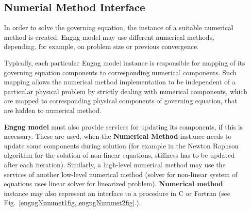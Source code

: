 \documentclass[a4paper]{article}
\newcommand{\class}[1]{{\bf #1}}
\begin{document}
\subsection{Numerial Method Interface}
In order
to solve the governing equation, the  instance of a suitable numerical method
is created. Engng model may use different numerical methods,
depending, for example, on problem size or previous convergence. 

Typically, each particular Engng model instance is responsible
for mapping of its governing equation components to corresponding
numerical components. Such mapping allows the numerical method implementation
to be independent of a particular physical problem by strictly dealing
with numerical components, which are mapped to corresponding physical
components of governing equation, that are  hidden to numerical method.

\class{Engng model} must also provide services for updating its
components, if this is necessary. These are used, when the \class{Numerical
Method} instance needs to update  some components during solution (for
example in the Newton Raphson algorithm for the solution of non-linear
equations, stiffness has to be updated after each
iteration). Similarly,  
a high-level numerical method may use the services of another
low-level numerical method (solver for non-linear system  of equations
uses  linear solver for linearized problem). \class{Numerical method}
instance may also represent an interface to a procedure in C or
Fortran (see Fig.~\ref{engngNummet1fig, engngNummet2fig}.). 
\end{document}
